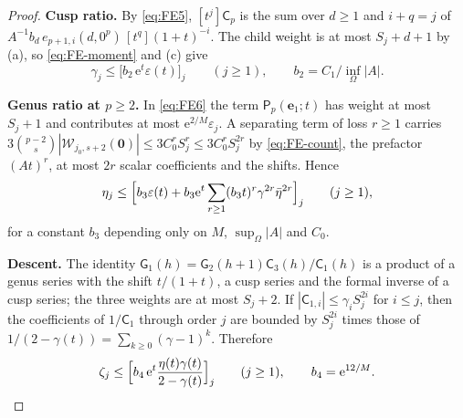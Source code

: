 \begin{proof}
\textbf{Cusp ratio.} By \eqref{eq:FE5}, $[t^j]\mathsf C_p$ is the sum over
$d\ge1$ and $i+q=j$ of $A^{-1}b_d\,e_{p+1,i}(d,0^p)\,[t^q](1+t)^{-i}$.
The child weight is at most $S_j+d+1$ by (a), so \eqref{eq:FE-moment}
and (c) give
\begin{equation}
 \gamma_j\le\bigl[b_2\,\mathrm{e}^{t}\varepsilon(t)\bigr]_j\qquad(j\ge1),
 \qquad b_2=C_1/\inf_\Omega|A|.
 \label{eq:FE-maj-C}
\end{equation}

\textbf{Genus ratio at $p\ge2$.} In \eqref{eq:FE6} the term
$\mathsf P_p(\mathbf e_1;t)$ has weight at most $S_j+1$ and contributes
at most $\mathrm{e}^{2/M}\varepsilon_j$. A separating term of loss $r\ge1$
carries $3\binom{p-2}s|\mathcal W_{j_0,s+2}(\mathbf0)|\le3C_0^rS_j^r\le3C_0^rS_j^{2r}$
by \eqref{eq:FE-count}, the prefactor $(At)^r$, at most $2r$ scalar
coefficients and the shifts. Hence
\begin{equation}
 \eta_j\le\Bigl[b_3\varepsilon(t)+b_3\mathrm{e}^{t}
 \sum_{r\ge1}(b_3t)^r\gamma^{2r}\bar\eta^{2r}\Bigr]_j\qquad(j\ge1),
 \label{eq:FE-maj-H}
\end{equation}
for a constant $b_3$ depending only on $M$, $\sup_\Omega|A|$ and $C_0$.

\textbf{Descent.} The identity
$\mathsf G_1(h)=\mathsf G_2(h+1)\mathsf C_3(h)/\mathsf C_1(h)$ is a
product of a genus series with the shift $t/(1+t)$, a cusp series and
the formal inverse of a cusp series; the three weights are at most
$S_j+2$. If $|\mathsf C_{1,i}|\le\gamma_iS_j^{2i}$ for $i\le j$, then the
coefficients of $1/\mathsf C_1$ through order $j$ are bounded by
$S_j^{2i}$ times those of $1/(2-\gamma(t))=\sum_{k\ge0}(\gamma-1)^k$.
Therefore
\begin{equation}
 \zeta_j\le\Bigl[b_4\,\mathrm{e}^{t}\frac{\eta(t)\gamma(t)}{2-\gamma(t)}\Bigr]_j
 \qquad(j\ge1),\qquad b_4=\mathrm{e}^{12/M}.
 \label{eq:FE-maj-G}
\end{equation}


\end{proof}
